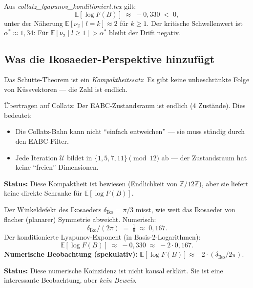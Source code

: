 \documentclass[12pt,a4paper]{article}
\newcommand{\vii}{\nu_2}
\newcommand{\Z}{\mathbb{Z}}
\newcommand{\E}{\mathbb{E}}
\newcommand{\logF}{\log F(B)}
\newcommand{\ZmZ}{\Z/12\Z}
\begin{document}
Aus \textit{collatz\_lyapunov\_konditioniert.tex} gilt:
\[
  \E[\logF] \;\approx\; -0{,}330 \;<\; 0,
\]
unter der Näherung $\E[\vii \mid l{=}k] \approx 2$ für $k \geq 1$.
Der kritische Schwellenwert ist $\alpha^* \approx 1{,}34$: Für
$\E[\vii \mid l\geq 1] > \alpha^*$ bleibt der Drift negativ.

\subsection{Was die Ikosaeder-Perspektive hinzufügt}

\begin{tcolorbox}[ikosaeder, title={Beitrag 1: Kompaktheitsargument (Analogie)}]
Das Schütte-Theorem ist ein \emph{Kompaktheitssatz}: Es gibt keine
unbeschränkte Folge von Küssvektoren --- die Zahl ist endlich.

Übertragen auf Collatz: Der EABC-Zustandsraum ist endlich (4 Zustände).
Dies bedeutet:
\begin{itemize}[noitemsep]
  \item Die Collatz-Bahn kann nicht ``einfach entweichen'' --- sie muss
        ständig durch den EABC-Filter.
  \item Jede Iteration $\mathcal{U}$ bildet in $\{1, 5, 7, 11\} \pmod{12}$
        ab --- der Zustandsraum hat keine ``freien'' Dimensionen.
\end{itemize}
\textbf{Status:} Diese Kompaktheit ist bewiesen (Endlichkeit von $\ZmZ$),
aber sie liefert keine direkte Schranke für $\E[\logF]$.
\end{tcolorbox}

\begin{tcolorbox}[ikosaeder, title={Beitrag 2: Winkeldefekt als Log-Drift (Analogie)}]
Der Winkeldefekt des Ikosaeders $\delta_{\text{Iko}} = \pi/3$ misst,
wie weit das Ikosaeder von flacher (planarer) Symmetrie abweicht.
Numerisch:
\[
  \delta_{\text{Iko}} / (2\pi) \;=\; \tfrac{1}{6} \;\approx\; 0{,}167.
\]
Der konditionierte Lyapunov-Exponent (in Basis-2-Logarithmen):
\[
  \E[\logF] \;\approx\; -0{,}330 \;\approx\; -2 \cdot 0{,}167.
\]
\textbf{Numerische Beobachtung (spekulativ):}
$\E[\logF] \approx -2 \cdot (\delta_{\text{Iko}} / 2\pi)$.

\medskip
\textbf{Status:} Diese numerische Koinzidenz ist nicht kausal erklärt.
Sie ist eine interessante Beobachtung, aber \emph{kein Beweis}.
\end{tcolorbox}
\end{document}

